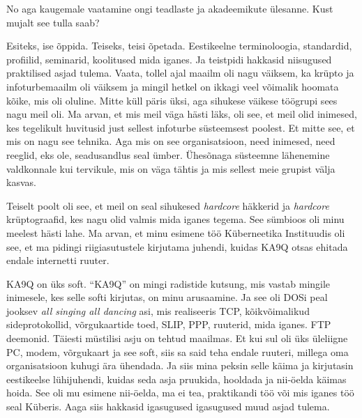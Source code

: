 No aga kaugemale vaatamine ongi teadlaste ja akadeemikute ülesanne. Kust mujalt 
see tulla saab? 


Esiteks, ise õppida. Teiseks, teisi õpetada. Eestikeelne terminoloogia, 
standardid, profiilid, seminarid, koolitused mida iganes.  Ja  teistpidi 
hakkasid niisugused praktilised asjad tulema. Vaata, tollel ajal maailm oli 
nagu väiksem, ka krüpto ja infoturbemaailm oli väiksem ja mingil hetkel on 
ikkagi veel võimalik hoomata  kõike, mis oli oluline. Mitte küll päris üksi, 
aga sihukese väikese töögrupi sees nagu meil oli. Ma arvan, et mis meil  väga 
hästi läks, oli see, et meil olid inimesed, kes  tegelikult  huvitusid just  
sellest infoturbe süsteemsest poolest. Et mitte see, et mis on nagu see 
tehnika. Aga mis on see organisatsioon, need inimesed, need reeglid, eks ole, 
seadusandlus seal ümber. Ühesõnaga süsteemne lähenemine valdkonnale kui 
tervikule, mis on  väga tähtis ja  mis sellest meie grupist välja kasvas. 

Teiselt poolt oli see, et meil on seal sihukesed \emph{hardcore} häkkerid ja 
\emph{hardcore} krüptograafid, kes nagu olid valmis mida iganes tegema. See 
sümbioos oli minu meelest hästi lahe. Ma arvan, et minu esimene töö 
Küberneetika Instituudis oli see, et ma pidingi riigiasutustele kirjutama 
juhendi, kuidas KA9Q otsas ehitada endale internetti ruuter. 


KA9Q on üks soft. \enquote{KA9Q} on mingi radistide kutsung, mis vastab mingile 
inimesele, kes selle softi kirjutas, on minu arusaamine. Ja see oli DOSi peal 
jooksev \emph{all singing all dancing} asi, mis realiseeris TCP, kõikvõimalikud 
sideprotokollid, võrgukaartide toed, SLIP, PPP, ruuterid, mida iganes. FTP 
deemonid. Täiesti müstilisi asju on tehtud maailmas.  Et kui sul oli üks  
üleliigne PC, modem, võrgukaart ja see soft, siis sa said teha endale ruuteri, 
millega oma organisatsioon kuhugi ära ühendada. Ja siis mina peksin selle käima 
ja kirjutasin eestikeelse lühijuhendi, kuidas seda asja  pruukida, hooldada ja 
nii-öelda käimas hoida. See oli mu esimene nii-öelda, ma ei tea, praktikandi 
töö või mis iganes töö seal Küberis. Aaga siis hakkasid igasugused igasugused 
muud asjad tulema.

